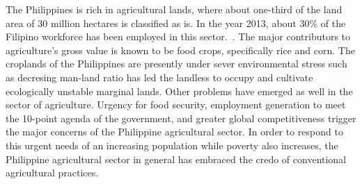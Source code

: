 The Philippines is rich in agricultural lands, where about one-third of the land area of 30 million hectares is classified as is. In the year 2013, about 30\% of the Filipino workforce has been employed in this sector.~\cite{WorldBank}. The major contributors to agriculture's gross value is known to be food crops, specifically rice and corn. The croplands of the Philippines are presently under sever environmental stress such as decresing man-land ratio has led the landless to occupy and cultivate ecologically unstable marginal lands. Other problems have emerged as well in the sector of agriculture. Urgency for food security, employment generation to meet the 10-point agenda of the government, and greater global competitiveness trigger the major concerns of the Philippine agricultural sector. In order to respond to this urgent needs of an increasing population while poverty also increases, the Philippine agricultural sector in general has embraced the credo of conventional agricultural practices.  ~\cite{agecon}
